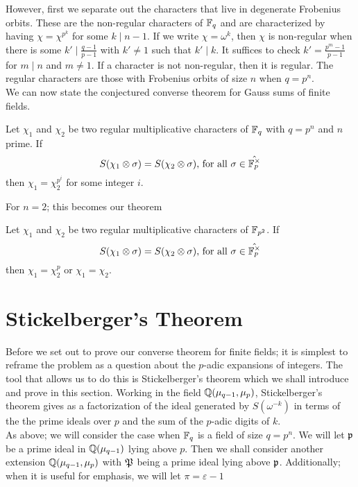 However, first we separate out the characters that live in degenerate Frobenius orbits. 
These are the non-regular characters of $\mathbb{F}_q$ and are characterized by having $\chi = \chi^{p^k}$ for some $k \mid n-1$. 
If we write $\chi = \omega^k$, then $\chi$ is non-regular when there is some $k' \mid \frac{q-1}{p-1}$ with $k' \neq 1$ such that $k' \mid k$.
It suffices to check $k' = \frac{p^m - 1}{p-1}$ for $m \mid n$ and $m \neq 1$.
If a character is not non-regular, then it is regular. 
The regular characters are those with Frobenius orbits of size $n$ when $q = p^n$.\\

We can now state the conjectured converse theorem for Gauss sums of finite fields.
\begin{conj}[Nien]\label{conj:local-converse-FF}
Let $\chi_1$ and $\chi_2$ be two regular multiplicative characters of $\mathbb{F}_q$ with $q = p^n$ and $n$ prime. If \[S(\chi_1 \otimes \sigma) = S(\chi_2 \otimes \sigma)\text{, for all } \sigma \in \hat{\mathbb{F}_p^\times}\] then $\chi_1 = \chi_2^{p^i}$ for some integer $i$.
\end{conj}

For $n=2$; this becomes our theorem 
\begin{theorem}\label{thm:local-converse-FF}
Let $\chi_1$ and $\chi_2$ be two regular multiplicative characters of $\mathbb{F}_{p^2}$. If \[S(\chi_1 \otimes \sigma) = S(\chi_2 \otimes \sigma)\text{, for all } \sigma \in \hat{\mathbb{F}_p^\times}\] then $\chi_1 = \chi_2^{p}$ or $\chi_1 = \chi_2$.
\end{theorem}


\section{Stickelberger's Theorem}
Before we set out to prove our converse theorem for finite fields; it is simplest to reframe the problem as a question about the $p$-adic expansions of integers.
The tool that allows us to do this is Stickelberger's theorem which we shall introduce and prove in this section.
Working in the field $\mathbb{Q}(\mu_{q-1}, \mu_p)$, Stickelberger's theorem gives as a factorization of the ideal generated by $S(\omega^{-k})$ in terms of the the prime ideals over $p$ and the sum of the $p$-adic digits of $k$.
\\

As above; we will consider the case when $\mathbb{F}_q$ is a field of size $q = p^n$. 
We will let $\mathfrak{p}$ be a prime ideal in $\mathbb{Q}(\mu_{q-1})$ lying above $p$. 
Then we shall consider another extension $\mathbb{Q}(\mu_{q-1}, \mu_p)$ with $\mathfrak{P}$ being a prime ideal lying above $\mathfrak{p}$. Additionally; when it is useful for emphasis, we will let $\pi = \varepsilon - 1$
\\

